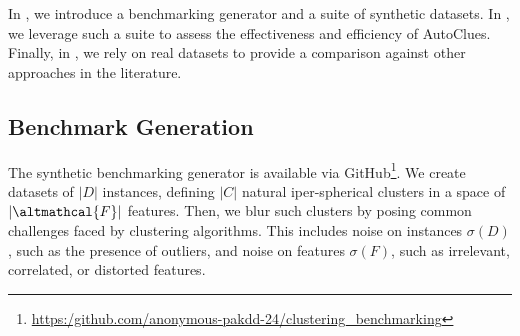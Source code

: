 
In , we introduce a benchmarking generator and a suite of synthetic datasets. In , we leverage such a suite to assess the effectiveness and efficiency of AutoClues.
Finally, in , we rely on real datasets to provide a comparison against other approaches in the literature.

\subsection{Benchmark Generation}
\label{clustering-ssec:benchmark}
The synthetic benchmarking generator is available via GitHub\footnote{\url{https:/github.com/anonymous-pakdd-24/clustering_benchmarking}}.
We create datasets of $|D|$ instances, defining $|C|$ natural iper-spherical clusters in a space of $|\altmathcal{F}|$ features.
Then, we blur such clusters by posing common challenges faced by clustering algorithms.
This includes noise on instances $\sigma(D)$, such as the presence of outliers, and
noise on features $\sigma(F)$, such as irrelevant, correlated, or distorted features.

